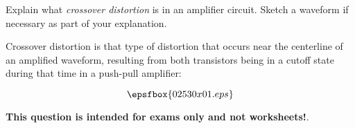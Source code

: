 

Explain what {\it crossover distortion} is in an amplifier circuit.  Sketch a waveform if necessary as part of your explanation.







Crossover distortion is that type of distortion that occurs near the centerline of an amplified waveform, resulting from both transistors being in a cutoff state during that time in a push-pull amplifier:

$$\epsfbox{02530x01.eps}$$







{\bf This question is intended for exams only and not worksheets!}.




